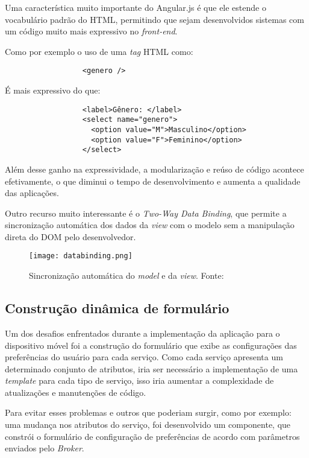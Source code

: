 Uma característica muito importante do Angular.js é que ele estende o vocabulário padrão do HTML, permitindo que sejam desenvolvidos sistemas com um código muito mais expressivo no \textit{front-end}.

Como por exemplo o uso de uma \textit{tag} HTML como: 
\begin{verbatim}
                  <genero />
\end{verbatim}

É mais expressivo do que:

\begin{verbatim}
                  <label>Gênero: </label>
                  <select name="genero">
                    <option value="M">Masculino</option>
                    <option value="F">Feminino</option>
                  </select>
\end{verbatim}

Além desse ganho na expressividade, a modularização e reúso de código acontece efetivamente, o que diminui o tempo de desenvolvimento e aumenta a qualidade das aplicações.

Outro recurso muito interessante é o \textit{Two-Way Data Binding}, que permite a sincronização automática dos dados da \textit{view} com o modelo sem a manipulação direta do DOM pelo desenvolvedor.

\begin{figure}[!htb]
  \centering
  \texttt{[image: databinding.png]} %
  \caption[Sincronização automática do \textit{model} e da \textit{view}]{Sincronização automática do \textit{model} e da \textit{view}. Fonte: \cite{angulardb}}
  \label{fig:twoway}
\end{figure}

\subsection{Construção dinâmica de formulário}
Um dos desafios enfrentados durante a implementação da aplicação para o dispositivo móvel foi a construção do formulário que exibe as configurações das preferências do usuário para cada serviço. Como cada serviço apresenta um determinado conjunto de atributos, iria ser necessário a implementação de uma \textit{template} para cada tipo de serviço, isso iria aumentar a complexidade de atualizações e manutenções de código.

Para evitar esses problemas e outros que poderiam surgir, como por exemplo: uma mudança nos atributos do serviço, foi desenvolvido um componente, que constrói o formulário de configuração de preferências de acordo com parâmetros enviados pelo \textit{Broker}.

